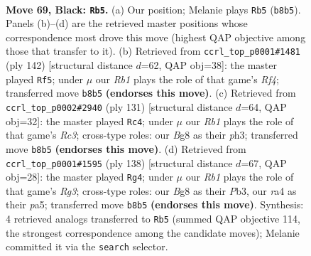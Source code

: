 \documentclass[11pt]{article}
\begin{document}
\clearpage

\begin{figure}[p]\centering
\begin{subfigure}{0.46\textwidth}\centering
\resizebox{\linewidth}{!}{%
\newchessgame
\chessboard[
  setfen={1r4b1/p1p1k1r1/P1p3p1/2P2p1p/RP3P1P/6R1/5K2/1N6 b - - 61 69},
  showmover=false,
  pgfstyle=straightmove, color=movearrow, markmove={b8-b5}
]}
\caption{}
\end{subfigure}\hfill
\begin{subfigure}{0.46\textwidth}\centering
\resizebox{\linewidth}{!}{%
\newchessgame
\chessboard[
  setfen={8/4r1k1/r4p2/2p4p/1p2PRpP/1P1P2P1/3RK3/8 w - - 1 72},
  showmover=false,
  pgfstyle=straightmove, color=movearrow, markmove={f4-f5}
]}
\caption{}
\end{subfigure}
\\[4pt]
\begin{subfigure}{0.46\textwidth}\centering
\resizebox{\linewidth}{!}{%
\newchessgame
\chessboard[
  setfen={1r6/4k3/2r1p2p/1p2R1p1/pP4P1/P1PR3P/2K5/8 b - - 8 66},
  showmover=false,
  pgfstyle=straightmove, color=movearrow, markmove={c6-c4}
]}
\caption{}
\end{subfigure}\hfill
\begin{subfigure}{0.46\textwidth}\centering
\resizebox{\linewidth}{!}{%
\newchessgame
\chessboard[
  setfen={2r2r2/6k1/1p1p2p1/p2P4/P3Pp1P/1P4R1/5R1K/8 w - - 0 70},
  showmover=false,
  pgfstyle=straightmove, color=movearrow, markmove={g3-g4}
]}
\caption{}
\end{subfigure}
\caption{\textbf{Move 69, Black: \texttt{Rb5}.} (a) Our position; Melanie plays \texttt{Rb5} (\texttt{b8b5}). Panels (b)--(d) are the retrieved master positions whose correspondence most drove this move (highest QAP objective among those that transfer to it). (b) Retrieved from \texttt{ccrl\_top\_p0001\#1481} (ply 142) [structural distance $d$=62, QAP obj=38]: the master played \texttt{Rf5}; under $\mu$ our \emph{Rb1} plays the role of that game's \emph{Rf4}; transferred move \texttt{b8b5} \textbf{(endorses this move)}. (c) Retrieved from \texttt{ccrl\_top\_p0002\#2940} (ply 131) [structural distance $d$=64, QAP obj=32]: the master played \texttt{Rc4}; under $\mu$ our \emph{Rb1} plays the role of that game's \emph{Rc3}; cross-type roles: our \emph{B}g8 as their \emph{p}h3; transferred move \texttt{b8b5} \textbf{(endorses this move)}. (d) Retrieved from \texttt{ccrl\_top\_p0001\#1595} (ply 138) [structural distance $d$=67, QAP obj=28]: the master played \texttt{Rg4}; under $\mu$ our \emph{Rb1} plays the role of that game's \emph{Rg3}; cross-type roles: our \emph{B}g8 as their \emph{P}b3, our \emph{r}a4 as their \emph{p}a5; transferred move \texttt{b8b5} \textbf{(endorses this move)}. Synthesis: 4 retrieved analogs transferred to \texttt{Rb5} (summed QAP objective 114, the strongest correspondence among the candidate moves); Melanie committed it via the \texttt{search} selector.}
\label{fig:thought-m137}
\end{figure}
\end{document}
